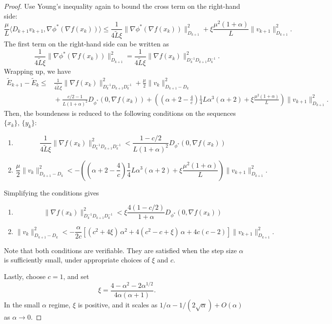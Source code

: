 \documentclass{article}
\theoremstyle{plain}
\theoremstyle{remark}
\begin{document}
\begin{proof}
Use Young's inequality again to bound the cross term on the right-hand side:
\[
\frac{\mu}{L}\langle D_{k+1}v_{k+1}, \nabla \phi^*(\nabla f(x_k))\rangle
\le \frac{1}{4\tilde{L}\xi}\|\nabla \phi^*(\nabla f(x_k))\|_{D_{k+1}}^2 + \xi\frac{\mu^2(1+\alpha)}{L}\|v_{k+1}\|_{D_{k+1}}^2.
\]
The first term on the right-hand side can be written as
\[\frac{1}{4\tilde{L}\xi}\|\nabla \phi^*(\nabla f(x_k))\|_{D_{k+1}}^2 = \frac{1}{4\tilde{L}\xi}\|\nabla f(x_k)\|_{D_k^{-1} D_{k+1} D_k^{-1}}^2.\]
Wrapping up, we have
\[\begin{aligned}
\widetilde{E}_{k+1} - \widetilde{E}_k
\le{}& \frac{1}{4\tilde{L}\xi}\|\nabla f(x_k)\|_{D_k^{-1} D_{k+1} D_k^{-1}}^2 + \frac{\mu}{2}\|v_k\|_{D_{k+1}-D_k}^2\\
&{} + \frac{c/2-1}{L(1+\alpha)^2}D_{\phi^*}(0,\nabla f(x_{k}))+ \left(\left( \alpha + 2 - \frac{4}{c} \right)\frac{1}{4}L\alpha^3(\alpha+2)+\xi\frac{\mu^2(1+\alpha)}{L}\right)\|v_{k+1}\|_{D_{k+1}}^2.
\end{aligned}\]
Then, the boundeness is reduced to the following conditions on the sequences $\{x_k\}$, $\{y_k\}$:
\begin{enumerate}
    \item $$\frac{1}{4\tilde{L}\xi}\|\nabla f(x_k)\|_{D_k^{-1} D_{k+1} D_k^{-1}}^2 < \frac{1-c/2}{L(1+\alpha)^2}D_{\phi^*}(0,\nabla f(x_{k}))$$
    \item $$\frac{\mu}{2}\|v_k\|_{D_{k+1}-D_k}^2 < -\left(\left( \alpha + 2 - \frac{4}{c} \right)\frac{1}{4}L\alpha^3(\alpha+2)+\xi\frac{\mu^2(1+\alpha)}{L}\right)\|v_{k+1}\|_{D_{k+1}}^2.$$
\end{enumerate}
Simplifying the conditions gives
\begin{enumerate}
    \item $$\|\nabla f(x_k)\|_{D_k^{-1} D_{k+1} D_k^{-1}}^2 < \xi\frac{4(1-c/2)}{1+\alpha}D_{\phi^*}(0,\nabla f(x_{k}))$$
    \item $$\|v_k\|_{D_{k+1}-D_k}^2 < -\frac{\alpha}{2c}\left[(c^{2}+4\xi)\,\alpha^{2}
+4(c^{2}-c+\xi)\,\alpha+4c(c-2)\right]\|v_{k+1}\|_{D_{k+1}}^2.$$
\end{enumerate}
Note that both conditions are verifiable. They are satisfied when the step size $\alpha$ is sufficiently small, under appropriate choices of $\xi$ and $c$.

Lastly, choose $c=1$, and set $$\xi =\frac{4 - \alpha^2 - 2\alpha^{1/2}}{4\alpha(\alpha + 1)}.$$ In the small $\alpha$ regime, $\xi$ is positive, and it scales as $1/\alpha-1/(2\sqrt{\alpha})+O(\alpha)$ as $\alpha\to 0$.
\end{proof}
\end{document}
